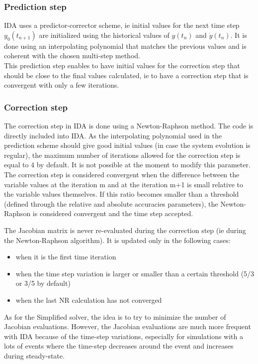 \documentclass[a4paper, 12pt]{report}
\begin{document}
\subsubsection{Prediction step}

\ac{IDA} uses a predictor-corrector scheme, ie initial values for the next time step $y_0(t_{n+1})$ are initialized using the historical values of $y(t_n)$ and $\dot{y}(t_n)$. It is done using an interpolating polynomial that matches the previous values and is coherent with the chosen multi-step method. \\

This prediction step enables to have initial values for the correction step that should be close to the final values calculated, ie to have a correction step that is convergent with only a few iterations.

\subsubsection{Correction step}

The correction step in IDA is done using a Newton-Raphson method. The code is directly included into IDA.
As the interpolating polynomial used in the prediction scheme should give good initial values (in case the system evolution is regular), the maximum number of iterations allowed for the correction step is equal to 4 by default. It is not possible at the moment to modify this parameter.
The correction step is considered convergent when the difference between the variable values at the iteration m and at the iteration m+1 is small relative to the variable values themselves. If this ratio becomes smaller than a threshold (defined through the relative and absolute accuracies parameters), the Newton-Raphson is considered convergent and the time step accepted.

The Jacobian matrix is never re-evaluated during the correction step (ie during the Newton-Raphson algorithm). It is updated only in the following cases:
\begin{itemize}
\item when it is the first time iteration
\item when the time step variation is larger or smaller than a certain threshold (5/3 or 3/5 by default)
\item when the last \ac{NR} calculation has not converged
\end{itemize}
As for the Simplified solver, the idea is to try to minimize the number of Jacobian evaluations. However, the Jacobian evaluations are much more frequent with IDA because of the time-step variations, especially for simulations with a lots of events where the time-step decreases around the event and increases during steady-state.
\end{document}
